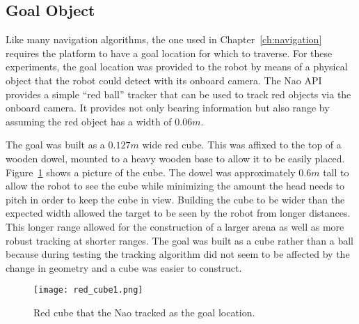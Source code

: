 \subsection{Goal Object}
Like many navigation algorithms, the one used in Chapter~\ref{ch:navigation}
requires the platform to have a goal location for which to traverse.
For these experiments, the goal location was provided to the robot by means
of a physical object that the robot could detect with its onboard camera.
The Nao API provides a simple ``red ball'' tracker that can be used to track
red objects via the onboard camera. It provides not only bearing information
but also range by assuming the red object has a width of $0.06 m$.

The goal was built as a $0.127 m$ wide red cube. 
This was affixed to the top of a wooden dowel, mounted to a heavy wooden base to 
allow it to be easily placed.
Figure~\ref{fig:red_cube1} shows a picture of the cube.
The dowel was approximately $0.6 m$ tall to allow the robot to see the cube
while minimizing the amount the head needs to pitch in order to keep 
the cube in view. Building the cube to be wider than the 
expected width allowed the target to be seen by the robot from longer distances. 
This longer range allowed for the construction of a larger arena as well as more 
robust tracking at shorter ranges.
The goal was built as a cube rather than a ball because during testing 
the tracking algorithm did not seem to be affected by the change in geometry 
and a cube was easier to construct. 

\begin{figure}
\centering
\texttt{[image: red\_cube1.png]}
\caption{Red cube that the Nao tracked as the goal location.}
\label{fig:red_cube1}
\end{figure}
